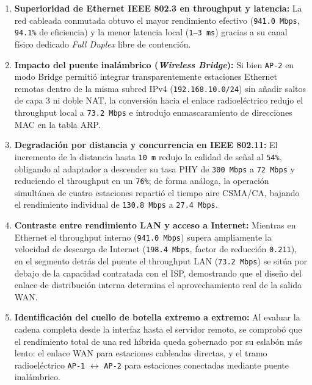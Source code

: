 \documentclass[11pt, a4paper]{article}
\begin{document}
\begin{enumerate}
    \item \textbf{Superioridad de Ethernet IEEE 802.3 en throughput y latencia:} La red cableada conmutada obtuvo el mayor rendimiento efectivo (\texttt{941.0 Mbps}, \texttt{94.1\%} de eficiencia) y la menor latencia local (\texttt{1--3 ms}) gracias a su canal físico dedicado \textit{Full Duplex} libre de contención.
    \item \textbf{Impacto del puente inalámbrico (\textit{Wireless Bridge}):} Si bien \texttt{AP-2} en modo Bridge permitió integrar transparentemente estaciones Ethernet remotas dentro de la misma subred IPv4 (\texttt{192.168.10.0/24}) sin añadir saltos de capa 3 ni doble NAT, la conversión hacia el enlace radioeléctrico redujo el throughput local a \texttt{73.2 Mbps} e introdujo enmascaramiento de direcciones MAC en la tabla ARP.
    \item \textbf{Degradación por distancia y concurrencia en IEEE 802.11:} El incremento de la distancia hasta \texttt{10 m} redujo la calidad de señal al \texttt{54\%}, obligando al adaptador a descender su tasa PHY de \texttt{300 Mbps} a \texttt{72 Mbps} y reduciendo el throughput en un \texttt{76\%}; de forma análoga, la operación simultánea de cuatro estaciones repartió el tiempo aire CSMA/CA, bajando el rendimiento individual de \texttt{130.8 Mbps} a \texttt{27.4 Mbps}.
    \item \textbf{Contraste entre rendimiento LAN y acceso a Internet:} Mientras en Ethernet el throughput interno (\texttt{941.0 Mbps}) supera ampliamente la velocidad de descarga de Internet (\texttt{198.4 Mbps}, factor de reducción \texttt{0.211}), en el segmento detrás del puente el throughput LAN (\texttt{73.2 Mbps}) se sitúa por debajo de la capacidad contratada con el ISP, demostrando que el diseño del enlace de distribución interna determina el aprovechamiento real de la salida WAN.
    \item \textbf{Identificación del cuello de botella extremo a extremo:} Al evaluar la cadena completa desde la interfaz hasta el servidor remoto, se comprobó que el rendimiento total de una red híbrida queda gobernado por su eslabón más lento: el enlace WAN para estaciones cableadas directas, y el tramo radioeléctrico \texttt{AP-1} $\leftrightarrow$ \texttt{AP-2} para estaciones conectadas mediante puente inalámbrico.
\end{enumerate}
\end{document}
